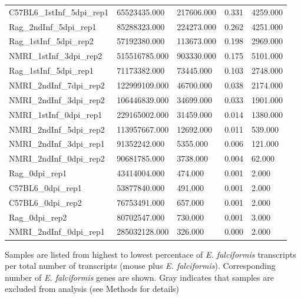 \documentclass{article}
\begin{document}
\begin{table}[H]
\begin{tabular}{*5l}
C57BL6\_1stInf\_5dpi\_rep1 & 65523435.000 & 217606.000 & 0.331 & 4259.000 \\ 
Rag\_2ndInf\_5dpi\_rep1 & 85288323.000 & 224273.000 & 0.262 & 4251.000 \\ 
Rag\_1stInf\_5dpi\_rep2 & 57192380.000 & 113673.000 & 0.198 & 2969.000 \\ 
NMRI\_1stInf\_3dpi\_rep2 & 515516785.000 & 903330.000 & 0.175 & 5101.000 \\ 
Rag\_1stInf\_5dpi\_rep1 & 71173382.000 & 73445.000 & 0.103 & 2748.000 \\ 
NMRI\_2ndInf\_7dpi\_rep2 & 122999109.000 & 46700.000 & 0.038 & 2174.000 \\ 
NMRI\_2ndInf\_3dpi\_rep2 & 106446839.000 & 34699.000 & 0.033 & 1901.000 \\ 
	 {\color{Gray}NMRI\_1stInf\_0dpi\_rep1} &  {\color{Gray}229165002.000} & {\color{Gray} 31459.000} &  {\color{Gray}0.014} & {\color{Gray} 1380.000} \\ 
NMRI\_2ndInf\_5dpi\_rep2 & 113957667.000 & 12692.000 & 0.011 & 539.000 \\ 
NMRI\_2ndInf\_3dpi\_rep1 & 91352242.000 & 5355.000 & 0.006 & 121.000 \\ 
NMRI\_2ndInf\_0dpi\_rep2 & 90681785.000 & 3738.000 & 0.004 & 62.000 \\ 
Rag\_0dpi\_rep1 & 43414004.000 & 474.000 & 0.001 & 2.000 \\ 
C57BL6\_0dpi\_rep1 & 53877840.000 & 491.000 & 0.001 & 2.000 \\ 
C57BL6\_0dpi\_rep2 & 76753491.000 & 657.000 & 0.001 & 2.000 \\ 
Rag\_0dpi\_rep2 & 80702547.000 & 730.000 & 0.001 & 3.000 \\ 
NMRI\_2ndInf\_0dpi\_rep1 & 285032128.000 & 326.000 & 0.000 & 2.000 \\ 
\bottomrule
\hline
\end{tabular}
\end{table}

Samples are listed from highest to lowest percentace of \textit{E. falciformis} transcripts per total number of transcripts (mouse plus \textit{E. falciformis}). Corresponding number of \textit{E. falciformis} genes are shown. Gray indicates that samples are excluded from analysis (see Methods for details)


\end{document}
